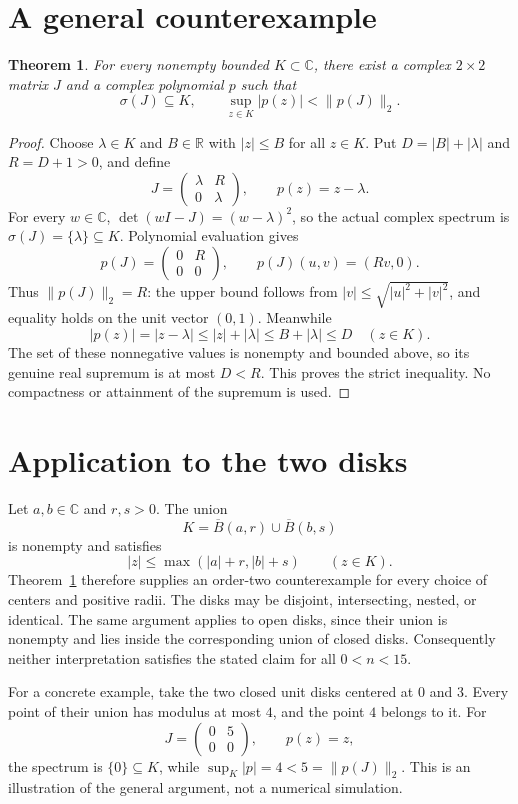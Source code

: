 \documentclass[11pt]{article}
\newtheorem{theorem}{Theorem}
\newcommand{\C}{\mathbb C}
\newcommand{\R}{\mathbb R}
\begin{document}
\section{A general counterexample}
\begin{theorem}\label{general}
For every nonempty bounded $K\subset\C$, there exist a complex $2\times2$ matrix $J$ and a complex polynomial $p$ such that
\[
 \sigma(J)\subseteq K,\qquad
 \sup_{z\in K}|p(z)|<\|p(J)\|_2.
\]
\end{theorem}
\begin{proof}
Choose $\lambda\in K$ and $B\in\R$ with $|z|\leq B$ for all $z\in K$. Put $D=|B|+|\lambda|$ and $R=D+1>0$, and define
\[
 J=\begin{pmatrix}\lambda&R\\0&\lambda\end{pmatrix},
 \qquad p(z)=z-\lambda.
\]
For every $w\in\C$, $\det(wI-J)=(w-\lambda)^2$, so the actual complex spectrum is $\sigma(J)=\{\lambda\}\subseteq K$. Polynomial evaluation gives
\[
 p(J)=\begin{pmatrix}0&R\\0&0\end{pmatrix},\qquad
 p(J)(u,v)=(Rv,0).
\]
Thus $\|p(J)\|_2=R$: the upper bound follows from $|v|\leq\sqrt{|u|^2+|v|^2}$, and equality holds on the unit vector $(0,1)$. Meanwhile
\[
 |p(z)|=|z-\lambda|\leq |z|+|\lambda|\leq B+|\lambda|\leq D\quad(z\in K).
\]
The set of these nonnegative values is nonempty and bounded above, so its genuine real supremum is at most $D<R$. This proves the strict inequality. No compactness or attainment of the supremum is used.
\end{proof}

\section{Application to the two disks}
Let $a,b\in\C$ and $r,s>0$. The union
\[
 K=\overline{B}(a,r)\cup\overline{B}(b,s)
\]
is nonempty and satisfies
\[
 |z|\leq\max(|a|+r,|b|+s)\qquad(z\in K).
\]
Theorem~\ref{general} therefore supplies an order-two counterexample for every choice of centers and positive radii. The disks may be disjoint, intersecting, nested, or identical. The same argument applies to open disks, since their union is nonempty and lies inside the corresponding union of closed disks. Consequently neither interpretation satisfies the stated claim for all $0<n<15$.

For a concrete example, take the two closed unit disks centered at $0$ and $3$. Every point of their union has modulus at most $4$, and the point $4$ belongs to it. For
\[
 J=\begin{pmatrix}0&5\\0&0\end{pmatrix},\qquad p(z)=z,
\]
the spectrum is $\{0\}\subseteq K$, while $\sup_K|p|=4<5=\|p(J)\|_2$. This is an illustration of the general argument, not a numerical simulation.
\end{document}
